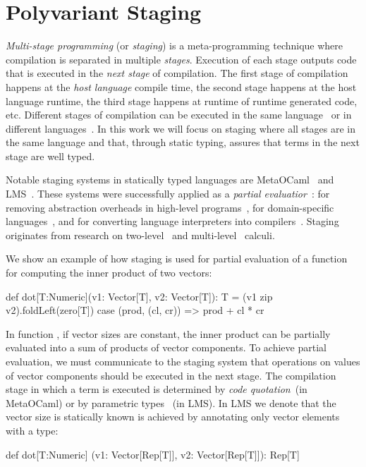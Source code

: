 
\chapter{Polyvariant Staging}

 \emph{Multi-stage programming} (or \emph{staging}) is a meta-programming technique
  where compilation is separated in multiple \emph{stages}. Execution of each
  stage outputs code that is executed in the \emph{next stage} of compilation. The first
  stage of compilation happens at the \emph{host language} compile time, the second
  stage happens at the host language runtime, the third stage happens at runtime of
  runtime generated code, etc. Different stages of compilation can be executed in the same
  language~\cite{taha_multi-stage_1997,nielson2005two} or in different languages~\cite{brown_heterogeneous_2011,devito2013terra}.
  In this work we will focus on staging where all stages are in the same language and that, through static typing, assures that terms in the next stage are well typed.

  Notable staging systems in statically typed languages are
  MetaOCaml~\cite{taha_multi-stage_1997,calcagno2003implementing}
  and LMS~\cite{rompf2012lightweight}. These systems were successfully applied as a
  \emph{partial evaluatior}~\cite{jones1993partial}: for removing abstraction
  overheads in high-level programs~\cite{carette2005multi,rompf2012lightweight},
  for domain-specific languages~\cite{czarnecki_dsl_2004,jonnalagedda2014staged,taha2004gentle}, and for converting language
  interpreters into compilers~\cite{lancet,futamura1999partial}. Staging originates
  from research on two-level~\cite{nielson2005two,davies1996temporal} and multi-level~\cite{davies1996modal} calculi.

 We show an example of how staging is used for partial evaluation of a function
 for computing the inner product of two vectors\footnotemark[1]:\begin{lstparagraph}
def dot[T:Numeric](v1: Vector[T], v2: Vector[T]): T =
  (v1 zip v2).foldLeft(zero[T]) {
    case (prod, (cl, cr)) => prod + cl * cr
  }
 \end{lstparagraph}

In function , if vector sizes are constant, the inner product can
 be partially evaluated into a sum of products of vector components. To achieve partial evaluation,
 we must communicate to the staging system that operations on values of vector components
 should be executed in the next stage. The compilation stage
 in which a term is executed is determined by \emph{code quotation}~(in MetaOCaml)
 or by parametric types ~(in LMS). In LMS we denote that the vector size
 is statically known is achieved by annotating only vector elements with
 a  type\footnotemark[2]:\begin{lstparagraph}
def dot[T:Numeric]
  (v1: Vector[Rep[T]], v2: Vector[Rep[T]]): Rep[T]
 \end{lstparagraph}

